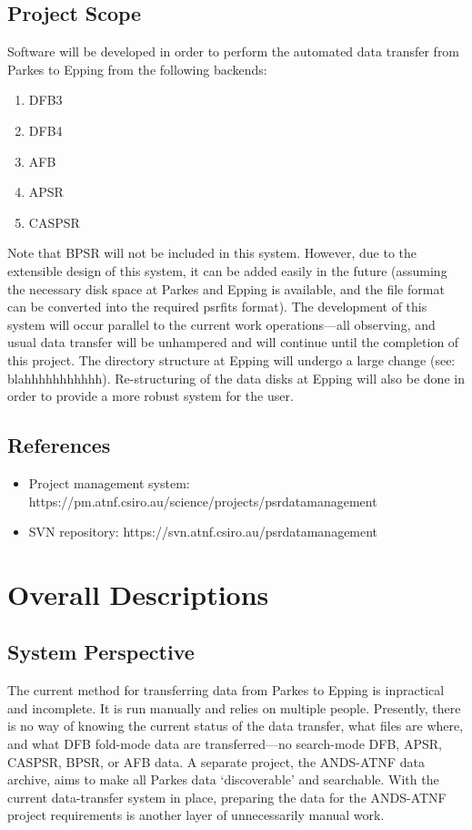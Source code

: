 \documentclass[a4paper,11pt]{article}
\begin{document}
\subsection{Project Scope}
Software will be developed in order to perform the automated data transfer from Parkes to Epping from the following backends:
\begin{enumerate}
\item DFB3
\item DFB4
\item AFB
\item APSR
\item CASPSR
\end{enumerate}

Note that BPSR will not be included in this system. However, due to the extensible design of this system, it can be added easily in the future (assuming the necessary disk space at Parkes and Epping is available, and the file format can be converted into the required psrfits format). The development of this system will occur parallel to the current work operations---all observing, and usual data transfer will be unhampered and will continue until the completion of this project. The directory structure at Epping will undergo a large change (see: blahhhhhhhhhhh). Re-structuring of the data disks at Epping will also be done in order to provide a more robust system for the user.

\subsection{References}
\begin{itemize}
\item Project management system: https://pm.atnf.csiro.au/science/projects/psrdatamanagement
\item SVN repository: https://svn.atnf.csiro.au/psrdatamanagement
\end{itemize}

\section{Overall Descriptions}
\subsection{System Perspective}
The current method for transferring data from Parkes to Epping is inpractical and incomplete. It is run manually and relies on multiple people. Presently, there is no way of knowing the current status of the data transfer, what files are where, and what DFB fold-mode data are transferred---no search-mode DFB, APSR, CASPSR, BPSR, or AFB data. A separate project, the ANDS-ATNF data archive, aims to make all Parkes data `discoverable' and searchable. With the current data-transfer system in place, preparing the data for the ANDS-ATNF project requirements is another layer of unnecessarily manual work.
\end{document}
